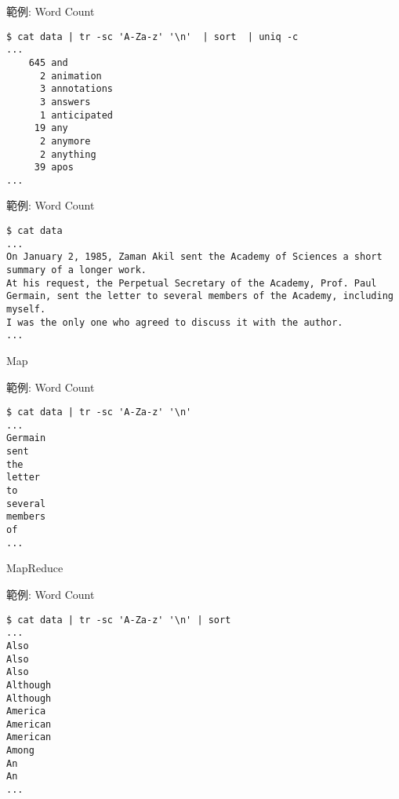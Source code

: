 \documentclass[12pt,c]{beamer}
\begin{document}
\begin{frame}[containsverbatim]{範例: Word Count}
\begin{verbatim}
$ cat data | tr -sc 'A-Za-z' '\n'  | sort  | uniq -c
...
    645 and
      2 animation
      3 annotations
      3 answers
      1 anticipated
     19 any
      2 anymore
      2 anything
     39 apos
...
\end{verbatim}
\end{frame}



\begin{frame}[containsverbatim]{範例: Word Count}
\begin{verbatim}
$ cat data 
...
On January 2, 1985, Zaman Akil sent the Academy of Sciences a short summary of a longer work.
At his request, the Perpetual Secretary of the Academy, Prof. Paul Germain, sent the letter to several members of the Academy, including myself.
I was the only one who agreed to discuss it with the author.
...
\end{verbatim}
\end{frame}

\begin{frame}{Map}
\end{frame}


\begin{frame}[containsverbatim]{範例: Word Count}
\begin{verbatim}
$ cat data | tr -sc 'A-Za-z' '\n' 
...
Germain
sent
the
letter
to
several
members
of
...
\end{verbatim}
\end{frame}

\begin{frame}{MapReduce}
\end{frame}



\begin{frame}[containsverbatim]{範例: Word Count}
\begin{verbatim}
$ cat data | tr -sc 'A-Za-z' '\n' | sort
...
Also
Also
Also
Although
Although
America
American
American
Among
An
An
...

\end{verbatim}
\end{frame}
\end{document}
